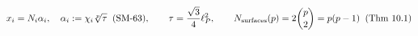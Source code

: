 \documentclass[preview]{standalone}
\begin{document}
\begin{align*}
\special{dvisvgm:raw <g id='unique000'>}x_i = N_i \alpha_i, \quad \alpha_i := \chi_i \sqrt[p]{\tau}\;\;(\text{SM-63}), \qquad \tau = \frac{\sqrt{3}}{4}\ell_P^2, \qquad N_{\mathrm{surfaces}}(p) = 2\binom{p}{2} = p(p-1)\;\;(\text{Thm 10.1})\special{dvisvgm:raw </g>}
\end{align*}
\end{document}
